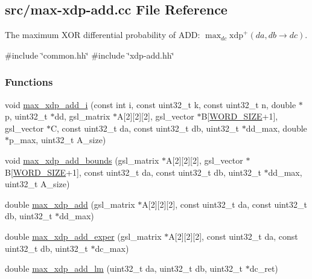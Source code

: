\hypertarget{max-xdp-add_8cc}{\subsection{src/max-\/xdp-\/add.cc \-File \-Reference}
\label{max-xdp-add_8cc}
}


\-The maximum \-X\-O\-R differential probability of \-A\-D\-D\-: $\max_{dc} \mathrm{xdp}^{+}(da, db \rightarrow dc)$.  


{\ttfamily \#include \char`\"{}common.\-hh\char`\"{}}\*
{\ttfamily \#include \char`\"{}xdp-\/add.\-hh\char`\"{}}\*
\subsubsection*{\-Functions}
\begin{DoxyCompactItemize}
\item 
void \hyperlink{max-xdp-add_8cc_aa26173f5384a2a72da858e5c5c860275}{max\-\_\-xdp\-\_\-add\-\_\-i} (const int i, const uint32\-\_\-t k, const uint32\-\_\-t n, double $\ast$p, uint32\-\_\-t $\ast$dd, gsl\-\_\-matrix $\ast$\-A\mbox{[}2\mbox{]}\mbox{[}2\mbox{]}\mbox{[}2\mbox{]}, gsl\-\_\-vector $\ast$\-B\mbox{[}\hyperlink{common_8hh_a92ed8507d1cd2331ad09275c5c4c1c89}{\-W\-O\-R\-D\-\_\-\-S\-I\-Z\-E}+1\mbox{]}, gsl\-\_\-vector $\ast$\-C, const uint32\-\_\-t da, const uint32\-\_\-t db, uint32\-\_\-t $\ast$dd\-\_\-max, double $\ast$p\-\_\-max, uint32\-\_\-t \-A\-\_\-size)
\item 
void \hyperlink{max-xdp-add_8cc_a248a6a0d0f09adf7a773cd7f1fb1fbe8}{max\-\_\-xdp\-\_\-add\-\_\-bounds} (gsl\-\_\-matrix $\ast$\-A\mbox{[}2\mbox{]}\mbox{[}2\mbox{]}\mbox{[}2\mbox{]}, gsl\-\_\-vector $\ast$\-B\mbox{[}\hyperlink{common_8hh_a92ed8507d1cd2331ad09275c5c4c1c89}{\-W\-O\-R\-D\-\_\-\-S\-I\-Z\-E}+1\mbox{]}, const uint32\-\_\-t da, const uint32\-\_\-t db, uint32\-\_\-t $\ast$dd\-\_\-max, uint32\-\_\-t \-A\-\_\-size)
\item 
double \hyperlink{max-xdp-add_8cc_a19d57935afe7dabc0628a3ea44c1f135}{max\-\_\-xdp\-\_\-add} (gsl\-\_\-matrix $\ast$\-A\mbox{[}2\mbox{]}\mbox{[}2\mbox{]}\mbox{[}2\mbox{]}, const uint32\-\_\-t da, const uint32\-\_\-t db, uint32\-\_\-t $\ast$dd\-\_\-max)
\item 
double \hyperlink{max-xdp-add_8cc_a54f1b6c27d0b3ef04dddcc1e190bc279}{max\-\_\-xdp\-\_\-add\-\_\-exper} (gsl\-\_\-matrix $\ast$\-A\mbox{[}2\mbox{]}\mbox{[}2\mbox{]}\mbox{[}2\mbox{]}, const uint32\-\_\-t da, const uint32\-\_\-t db, uint32\-\_\-t $\ast$dc\-\_\-max)
\item 
double \hyperlink{max-xdp-add_8cc_a1eda58229e5333a889252e475da39f67}{max\-\_\-xdp\-\_\-add\-\_\-lm} (uint32\-\_\-t da, uint32\-\_\-t db, uint32\-\_\-t $\ast$dc\-\_\-ret)
\end{DoxyCompactItemize}


